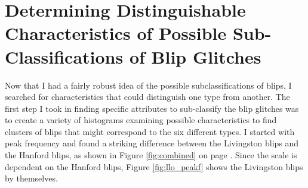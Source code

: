 \documentclass[a4paper]{article}
\begin{document}
\section{Determining Distinguishable Characteristics of Possible Sub-Classifications of Blip Glitches} \label{plots}

Now that I had a fairly robust idea of the possible subclassifications of blips, I searched for characteristics that could distinguish one type from another. The first step I took in finding specific attributes to sub-classify the blip glitches was to create a variety of histograms examining possible characteristics to find clusters of blips that might correspond to the six different types. I started with peak frequency and found a striking difference between the Livingston blips and the Hanford blips, as shown in Figure \ref{fig:combined} on page \pageref{fig:combined_peakf}. Since the scale is dependent on the Hanford blips, Figure \ref{fig:llo_peakf} shows the Livingston blips by themselves.
\end{document}

